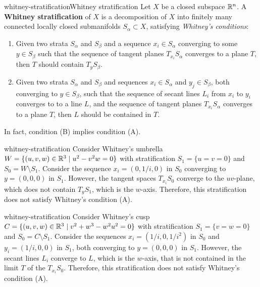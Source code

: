 \begin{topic}{whitney-stratification}{Whitney stratification}
    Let $X$ be a closed subspace $\mathbb{R}^n$. A \textbf{Whitney stratification} of $X$ is a decomposition of $X$ into finitely many connected locally closed submanifolds $S_\alpha \subset X$, satisfying \textit{Whitney's conditions}:
    \begin{enumerate}[label=(\Alph*)]
        \item Given two strata $S_\alpha$ and $S_\beta$ and a sequence $x_i \in S_\alpha$ converging to some $y \in S_\beta$ such that the sequence of tangent planes $T_{x_i} S_\alpha$ converges to a plane $T$, then $T$ should contain $T_y S_\beta$.
        \item Given two strata $S_\alpha$ and $S_\beta$ and sequences $x_i \in S_\alpha$ and $y_j \in S_\beta$, both converging to $y \in S_\beta$, such that the sequence of secant lines $L_i$ from $x_i$ to $y_i$ converges to to a line $L$, and the sequence of tangent planes $T_{x_i} S_\alpha$ converges to a plane $T$, then $L$ should be contained in $T$.
    \end{enumerate}
    In fact, condition (B) implies condition (A).
\end{topic}

\begin{example}{whitney-stratification}
    Consider Whitney's umbrella $W = \{ (u, v, w) \in \mathbb{R}^3 \mid u^2 - v^2 w = 0 \}$ with stratification $S_1 = \{ u = v = 0 \}$ and $S_0 = W \setminus S_1$. Consider the sequence $x_i = (0, 1/i, 0)$ in $S_0$ converging to $y = (0, 0, 0)$ in $S_1$. However, the tangent spaces $T_{x_i} S_0$ converge to the $uv$-plane, which does not contain $T_y S_1$, which is the $w$-axis. Therefore, this stratification does not satisfy Whitney's condition (A).
\end{example}

\begin{example}{whitney-stratification}
    Consider Whitney's cusp $C = \{ (u, v, w) \in \mathbb{R}^3 \mid v^2 + w^3 - w^2 u^2 = 0 \}$ with stratification $S_1 = \{ v = w = 0 \}$ and $S_0 = C \setminus S_1$.
    Consider the sequences $x_i = (1/i, 0, 1/i^2)$ in $S_0$ and $y_i = (1/i, 0, 0)$ in $S_1$, both converging to $y = (0, 0, 0)$ in $S_1$. However, the secant lines $L_i$ converge to $L$, which is the $w$-axis, that is not contained in the limit $T$ of the $T_{x_i} S_0$. Therefore, this stratification does not satisfy Whitney's condition (A).
\end{example}

